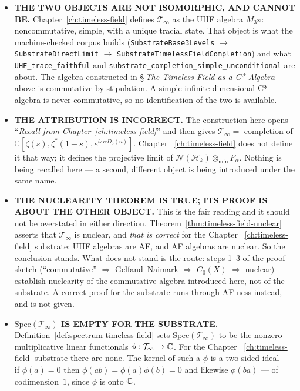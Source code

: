 \begin{itemize}
\item \textbf{THE TWO OBJECTS ARE NOT ISOMORPHIC, AND CANNOT BE.}
Chapter~\ref{ch:timeless-field} defines $\mathcal{T}_\infty$ as the UHF algebra
$M_{3^\infty}$: noncommutative, simple, with a unique tracial state. That object
is what the machine-checked corpus builds
(\texttt{SubstrateBase3Levels} $\to$ \texttt{SubstrateDirectLimit} $\to$
\texttt{SubstrateTimelessFieldCompletion}) and what
\texttt{UHF\_trace\_faithful} and
\texttt{substrate\_completion\_simple\_unconditional} are about. The algebra
constructed in \S\,\emph{The Timeless Field as a C*-Algebra} above is commutative by
stipulation. A simple infinite-dimensional C*-algebra is never commutative, so
no identification of the two is available.
\item \textbf{THE ATTRIBUTION IS INCORRECT.} The construction here opens
``\emph{Recall from Chapter~\ref{ch:timeless-field}}'' and then gives
$\mathcal{T}_\infty = $ completion of
$\mathbb{C}[\zeta(s),\zeta^*(1-s),e^{i\pi\alpha D_3(n)}]$. Chapter~%
\ref{ch:timeless-field} does not define it that way; it defines the projective
limit of $\mathcal{N}(\mathcal{H}_k)\otimes_{\min}F_\alpha$. Nothing is being
recalled here --- a second, different object is being introduced under the same
name.
\item \textbf{THE NUCLEARITY THEOREM IS TRUE; ITS PROOF IS ABOUT THE OTHER
OBJECT.} This is the fair reading and it should not be overstated in either
direction. Theorem~\ref{thm:timeless-field-nuclear} asserts that
$\mathcal{T}_\infty$ is nuclear, and \emph{that is correct} for the Chapter~%
\ref{ch:timeless-field} substrate: UHF algebras are AF, and AF algebras are
nuclear. So the conclusion stands. What does not stand is the route: steps 1--3
of the proof sketch (``commutative'' $\Rightarrow$ Gelfand--Naimark $\Rightarrow$
$C_0(X)$ $\Rightarrow$ nuclear) establish nuclearity of the commutative algebra
introduced here, not of the substrate. A correct proof for the substrate runs
through AF-ness instead, and is not given.
\item \textbf{$\mathrm{Spec}(\mathcal{T}_\infty)$ IS EMPTY FOR THE SUBSTRATE.}
Definition~\ref{def:spectrum-timeless-field} sets
$\mathrm{Spec}(\mathcal{T}_\infty)$ to be the nonzero multiplicative linear
functionals $\phi : \mathcal{T}_\infty \to \mathbb{C}$. For the Chapter~%
\ref{ch:timeless-field} substrate there are none. The kernel of such a $\phi$ is
a two-sided ideal --- if $\phi(a)=0$ then $\phi(ab)=\phi(a)\phi(b)=0$ and
likewise $\phi(ba)$ --- of codimension~$1$, since $\phi$ is onto $\mathbb{C}$.

\end{itemize}
